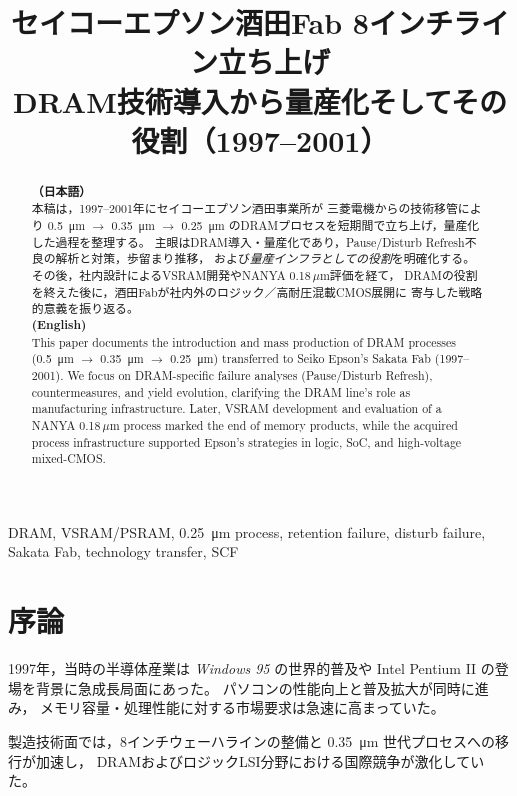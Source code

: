 \documentclass[conference]{IEEEtran}
\title{セイコーエプソン酒田Fab 8インチライン立ち上げ\\
DRAM技術導入から量産化そしてその役割（1997--2001）}
\author{%
  \IEEEauthorblockN{三溝 真一 (Shinichi Samizo)}%
  \IEEEauthorblockA{独立系半導体研究者（元セイコーエプソン）\\%
  Independent Semiconductor Researcher (ex-Seiko Epson)\\%
  Email: \href{mailto:shin3t72@gmail.com}{shin3t72@gmail.com}\\%
  GitHub: \url{https://github.com/Samizo-AITL}}%
}
\let\meter\metre
\begin{document}
\maketitle

\begin{abstract}
\textbf{（日本語）}\\
本稿は，1997--2001年にセイコーエプソン酒田事業所が
三菱電機からの技術移管により
\SI{0.5}{\micro\meter} $\rightarrow$ \SI{0.35}{\micro\meter} $\rightarrow$ \SI{0.25}{\micro\meter}
のDRAMプロセスを短期間で立ち上げ，量産化した過程を整理する。
主眼はDRAM導入・量産化であり，Pause/Disturb Refresh不良の解析と対策，歩留まり推移，
および\emph{量産インフラとしての役割}を明確化する。
その後，社内設計によるVSRAM開発やNANYA 0.18\,$\mu$m評価を経て，
DRAMの役割を終えた後に，酒田Fabが社内外のロジック／高耐圧混載CMOS展開に
寄与した戦略的意義を振り返る。\\[0.7ex]

\textbf{(English)}\\
This paper documents the introduction and mass production of DRAM processes
(\SI{0.5}{\micro\meter} $\rightarrow$ \SI{0.35}{\micro\meter} $\rightarrow$ \SI{0.25}{\micro\meter})
transferred to Seiko Epson's Sakata Fab (1997--2001).
We focus on DRAM-specific failure analyses (Pause/Disturb Refresh), countermeasures, and yield evolution,
clarifying the DRAM line's role as manufacturing infrastructure.
Later, VSRAM development and evaluation of a NANYA 0.18\,$\mu$m process marked the end of memory products,
while the acquired process infrastructure supported Epson's strategies in logic, SoC, and high-voltage mixed-CMOS.
\end{abstract}

\begin{IEEEkeywords}
DRAM, VSRAM/PSRAM, \SI{0.25}{\micro\meter} process, retention failure, disturb failure, Sakata Fab, technology transfer, SCF
\end{IEEEkeywords}

\section{序論}
1997年，当時の半導体産業は \textit{Windows 95} の世界的普及や
Intel Pentium II の登場を背景に急成長局面にあった。
パソコンの性能向上と普及拡大が同時に進み，
メモリ容量・処理性能に対する市場要求は急速に高まっていた。

製造技術面では，8インチウェーハラインの整備と
\SI{0.35}{\micro\meter} 世代プロセスへの移行が加速し，
DRAMおよびロジックLSI分野における国際競争が激化していた。
\end{document}
